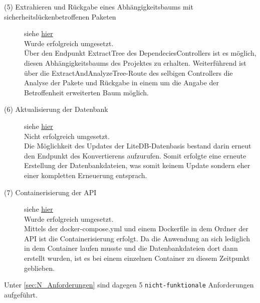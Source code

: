 \begin{description}
        \item[(5) Extrahieren und Rückgabe eines Abhängigkeitsbaums mit sicher\-heits\-lücken\-betroffenen Paketen] siehe \hyperref[f:five]{\underline{hier}} \hfill \\
            Wurde erfolgreich umgesetzt.
            \\
            Über den Endpunkt ExtractTree des DependeciesControllers ist es möglich, diesen Abhängig\-keitsbaums des Projektes zu erhalten.
            Weiterführend ist über die ExtractAndAnalyzeTree-Route des selbigen Controllers die Analyse der Pakete und Rückgabe in einem um die Angabe der Betroffenheit erweiterten Baum möglich.
        \item[(6) Aktualisierung der Datenbank] siehe \hyperref[f:six]{\underline{hier}} \hfill \\
            Nicht erfolgreich umgesetzt.
            \\
            Die Möglichkeit des Updates der LiteDB-Datenbasis bestand darin erneut den Endpunkt des Konvertierens aufzurufen.
            Somit erfolgte eine erneute Erstellung der Datenbankdateien, was somit keinem Update sondern eher einer kompletten Erneuerung entsprach.
        \item[(7) Containerisierung der \ac{API}] siehe \hyperref[f:seven]{\underline{hier}} \hfill \\
            Wurde erfolgreich umgesetzt.
            \\
            Mittels der docker-compose.yml und einem Dockerfile in dem Ordner der API ist die Containerisierung erfolgt.
            Da die Anwendung an sich lediglich in dem Container laufen musste und die Datenbankdateien dort dann erstellt wurden, ist es bei einem einzelnen Container zu diesem Zeitpunkt geblieben.
    \end{description}

    \noindent Unter \ref{sec:N_Anforderungen}  sind dagegen 5 \texttt{nicht-funktionale} Anforderungen aufgeführt.

